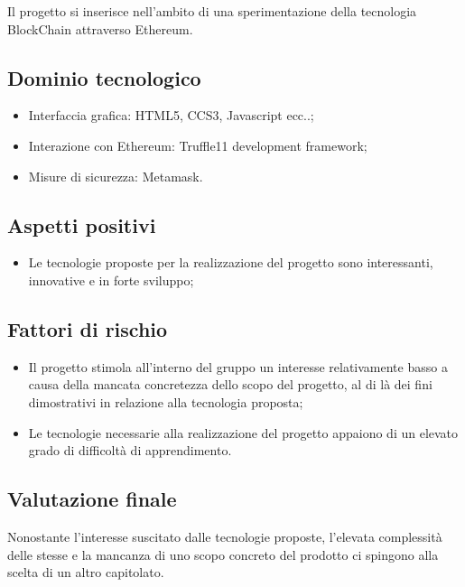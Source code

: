 \documentclass[openany,12pt,a4paper]{report}
\begin{document}
Il progetto si inserisce nell'ambito di una sperimentazione della tecnologia BlockChain attraverso Ethereum.

\subsection{Dominio tecnologico}

\begin{itemize}
    \item{Interfaccia grafica:} HTML5, CCS3, Javascript ecc..;
    
    \item{Interazione con Ethereum:} Truffle11 development framework;
    
    \item{Misure di sicurezza:} Metamask.
\end{itemize}

\subsection{Aspetti positivi}

\begin{itemize}
    \item Le tecnologie proposte per la realizzazione del progetto sono interessanti, innovative e in forte sviluppo;
\end{itemize}

\subsection{Fattori di rischio}

\begin{itemize}
    \item Il progetto stimola all'interno del gruppo un interesse relativamente basso a causa della mancata concretezza dello scopo del progetto, al di là dei fini dimostrativi in relazione alla tecnologia proposta;
    
    \item Le tecnologie necessarie alla realizzazione del progetto appaiono di un elevato grado di difficoltà di apprendimento.
\end{itemize}

\subsection{Valutazione finale}

Nonostante l'interesse suscitato dalle tecnologie proposte, l'elevata complessità delle stesse e la mancanza di uno scopo concreto del prodotto ci spingono alla scelta di un altro capitolato.
\end{document}
